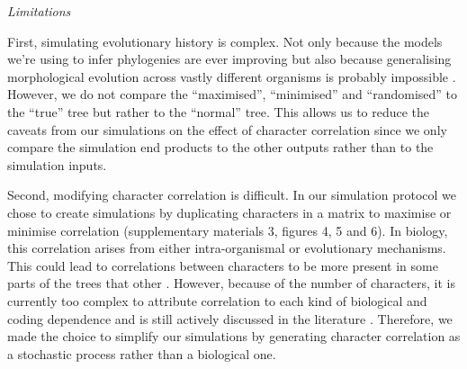 \documentclass[12pt,letterpaper]{article}
\renewcommand{\subsection}[1]{%
\bigskip
\begin{center}
\begin{large}
\normalfont\itshape #1
\end{large}
\end{center}}
\begin{document}
\subsection{Limitations}
First, simulating evolutionary history is complex.
Not only because the models we're using to infer phylogenies are ever improving \citep[e.g.][]{heath2014fossilized,Wright01072016} but also because generalising morphological evolution across vastly different organisms is probably impossible \citep[see constrasted discussions from][]{GoloboffEmpirical,OReillyEmpirical}.
However, we do not compare the ``maximised'', ``minimised'' and ``randomised'' to the ``true'' tree but rather to the ``normal'' tree.
This allows us to reduce the caveats from our simulations on the effect of character correlation since we only compare the simulation end products to the other outputs rather than to the simulation inputs.
 
Second, modifying character correlation is difficult. %
In our simulation protocol we chose to create simulations by duplicating characters in a matrix to maximise or minimise correlation (supplementary materials 3, figures 4, 5 and 6).
In biology, this correlation arises from either intra-organismal or evolutionary mechanisms.
This could lead to correlations between characters to be more present in some parts of the trees that other \citep[e.g. in the case of inapplicable data ][]{BrazeauNA}.
However, because of the number of characters, it is currently too complex to attribute correlation to each kind of biological  and coding dependence and is still actively discussed in the literature \citep{Lande1983,Maddison1990,Pagel1994,Pagel2006,goswami2006morphological,goswami2010,goswami2014macroevolutionary,Grabowski2016}.
Therefore, we made the choice to simplify our simulations by generating character correlation as a stochastic process rather than a biological one.
\end{document}
